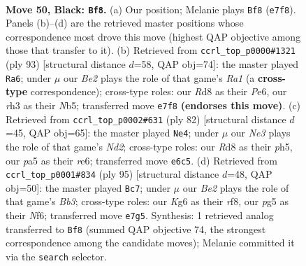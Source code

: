 \documentclass[11pt]{article}
\begin{document}
\clearpage

\begin{figure}[p]\centering
\begin{subfigure}{0.46\textwidth}\centering
\resizebox{\linewidth}{!}{%
\newchessgame
\chessboard[
  setfen={3r4/4b2p/p2pn1k1/P3p1Pp/1BP1P3/1P3P1R/2K3B1/8 b - - 2 50},
  showmover=false,
  pgfstyle=straightmove, color=movearrow, markmove={e7-f8}
]}
\caption{}
\end{subfigure}\hfill
\begin{subfigure}{0.46\textwidth}\centering
\resizebox{\linewidth}{!}{%
\newchessgame
\chessboard[
  setfen={r5k1/6pp/2b1p3/1n1pP2P/1BpP1P2/p1P2B2/3K2P1/R7 b - - 4 47},
  showmover=false,
  pgfstyle=straightmove, color=movearrow, markmove={a8-a6}
]}
\caption{}
\end{subfigure}
\\[4pt]
\begin{subfigure}{0.46\textwidth}\centering
\resizebox{\linewidth}{!}{%
\newchessgame
\chessboard[
  setfen={6k1/R3b3/p1p1r3/2p2bpp/2P2p2/P2P3P/2BN1KP1/8 w - - 0 42},
  showmover=false,
  pgfstyle=straightmove, color=movearrow, markmove={d2-e4}
]}
\caption{}
\end{subfigure}\hfill
\begin{subfigure}{0.46\textwidth}\centering
\resizebox{\linewidth}{!}{%
\newchessgame
\chessboard[
  setfen={5R2/r5p1/1b1k1n1p/3pp3/1P3p1P/1BB2P2/2P1KP2/8 b - - 13 48},
  showmover=false,
  pgfstyle=straightmove, color=movearrow, markmove={b6-c7}
]}
\caption{}
\end{subfigure}
\caption{\textbf{Move 50, Black: \texttt{Bf8}.} (a) Our position; Melanie plays \texttt{Bf8} (\texttt{e7f8}). Panels (b)--(d) are the retrieved master positions whose correspondence most drove this move (highest QAP objective among those that transfer to it). (b) Retrieved from \texttt{ccrl\_top\_p0000\#1321} (ply 93) [structural distance $d$=58, QAP obj=74]: the master played \texttt{Ra6}; under $\mu$ our \emph{Be2} plays the role of that game's \emph{Ra1} (a \textbf{cross-type} correspondence); cross-type roles: our \emph{R}d8 as their \emph{P}e6, our \emph{r}h3 as their \emph{N}b5; transferred move \texttt{e7f8} \textbf{(endorses this move)}. (c) Retrieved from \texttt{ccrl\_top\_p0002\#631} (ply 82) [structural distance $d$=45, QAP obj=65]: the master played \texttt{Ne4}; under $\mu$ our \emph{Ne3} plays the role of that game's \emph{Nd2}; cross-type roles: our \emph{R}d8 as their \emph{p}h5, our \emph{p}a5 as their \emph{r}e6; transferred move \texttt{e6c5}. (d) Retrieved from \texttt{ccrl\_top\_p0001\#834} (ply 95) [structural distance $d$=48, QAP obj=50]: the master played \texttt{Bc7}; under $\mu$ our \emph{Be2} plays the role of that game's \emph{Bb3}; cross-type roles: our \emph{K}g6 as their \emph{r}f8, our \emph{p}g5 as their \emph{N}f6; transferred move \texttt{e7g5}. Synthesis: 1 retrieved analog transferred to \texttt{Bf8} (summed QAP objective 74, the strongest correspondence among the candidate moves); Melanie committed it via the \texttt{search} selector.}
\label{fig:thought-m99}
\end{figure}
\end{document}
